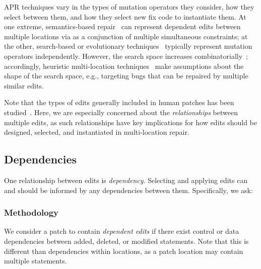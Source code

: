 \documentclass[10pt,journal,compsoc]{IEEEtran}
\begin{document}
APR techniques vary in the types of
mutation operators they consider, how they select between them, and how they
select new fix code to instantiate them. 
%
At one extreme, semantics-based repair~\cite{s3,angelix} can represent dependent edits between multiple
locations via as a conjunction of multiple simultaneous constraints; at the other, 
search-based or
evolutionary techniques~\cite{genprog,par} typically represent mutation
operators independently. 
However, the search space increases combinatorially~\cite{ae,long-search-spaces}; accordingly, 
heuristic multi-location
techniques~\cite{saha2019harnessing} make assumptions about the 
shape of the search space, e.g., targeting bugs that can be repaired by multiple similar edits.

Note that the types of edits generally included in human patches has been
studied~\cite{zhong2015,soto}.  Here, we are especially
concerned about the 
\emph{relationships} between multiple edits, as such relationships have
key implications for how edits should be designed, selected, and instantiated 
in multi-location repair. 

\subsection{Dependencies}

One relationship between edits is
\emph{dependency}. Selecting and applying edits can
and should be informed by any dependencies between them.  Specifically, we ask:


\subsubsection{Methodology}
We consider a patch to contain \emph{dependent edits} if there exist 
control or data dependencies between added, deleted, or modified statements.
Note that this is different than dependencies within locations, 
as a patch location may contain multiple statements.
\end{document}
